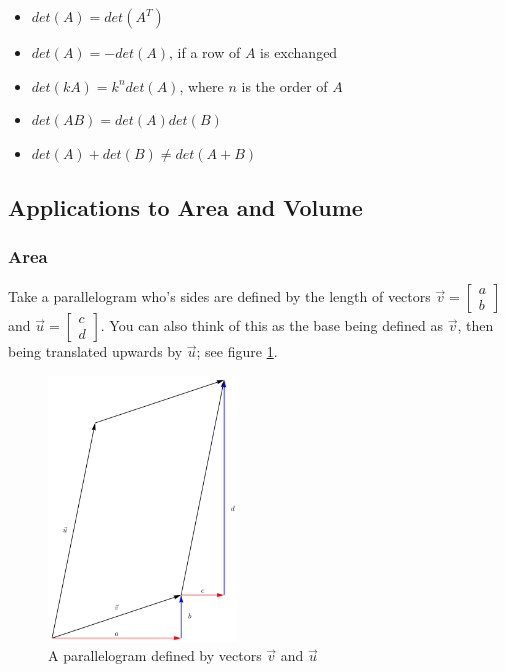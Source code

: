 \documentclass[12pt]{article}
\begin{document}
{\begin{itemize}
    \item $det(A) = det(A^T)$
    \item $det(A) = -det(A)$, if a row of $A$ is exchanged
    \item $det(kA) = k^n det(A)$, where $n$ is the order of $A$
    \item $det(AB) = det(A)det(B)$
    \item $det(A) + det(B) \neq det(A+B)$
\end{itemize}

\subsection{Applications to Area and Volume}

\subsubsection{Area}

Take a parallelogram who's sides are defined by the length of vectors $\vec{v} = \begin{bmatrix}
    a\\
    b
\end{bmatrix}$ and $\vec{u} = \begin{bmatrix}
    c\\
    d
\end{bmatrix}$. You can also think of this as the base being defined as $\vec{v}$, then being translated upwards by $\vec{u}$; see figure \ref{fig:parallelogram}.

\begin{figure}
    \centering
    \includegraphics[width=5cm]{misc/parallelogram.png}
    \caption{A parallelogram defined by vectors $\vec{v}$ and $\vec{u}$}
    \label{fig:parallelogram}
\end{figure}

}
\end{document}
